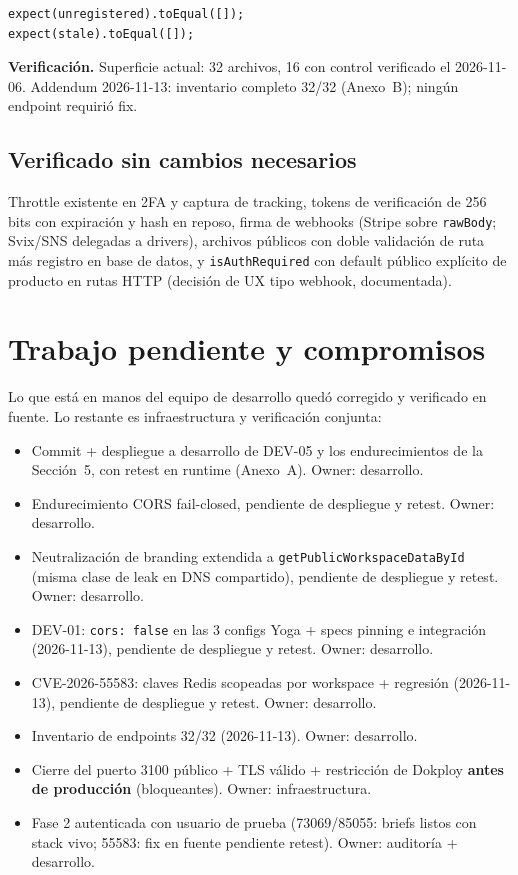\documentclass[11pt,a4paper]{article}
\begin{document}
\begin{lstlisting}[style=ts]
expect(unregistered).toEqual([]);
expect(stale).toEqual([]);
\end{lstlisting}

\textbf{Verificación.} Superficie actual: 32 archivos, 16 con control verificado el
2026-11-06. Addendum 2026-11-13: inventario completo 32/32 (Anexo~B); ningún
endpoint requirió fix.

\subsection{Verificado sin cambios necesarios}

Throttle existente en 2FA y captura de tracking, tokens de verificación de 256 bits
con expiración y hash en reposo, firma de webhooks (Stripe sobre \texttt{rawBody};
Svix/SNS delegadas a drivers), archivos públicos con doble validación de ruta más
registro en base de datos, y \texttt{isAuthRequired} con default público explícito de
producto en rutas HTTP (decisión de UX tipo webhook, documentada).

\section{Trabajo pendiente y compromisos}

Lo que está en manos del equipo de desarrollo quedó corregido y verificado en fuente.
Lo restante es infraestructura y verificación conjunta:

\begin{itemize}
\item[$\square$] Commit + despliegue a desarrollo de DEV-05 y los endurecimientos
de la Sección~5, con retest en runtime (Anexo~A). Owner: desarrollo.
\item[$\boxtimes$] Endurecimiento CORS fail-closed, pendiente de despliegue y
retest. Owner: desarrollo.
\item[$\boxtimes$] Neutralización de branding extendida a
\texttt{getPublicWorkspaceDataById} (misma clase de leak en DNS compartido),
pendiente de despliegue y retest. Owner: desarrollo.
\item[$\boxtimes$] DEV-01: \texttt{cors: false} en las 3 configs Yoga + specs
pinning e integración (2026-11-13), pendiente de despliegue y retest. Owner:
desarrollo.
\item[$\boxtimes$] CVE-2026-55583: claves Redis scopeadas por workspace +
regresión (2026-11-13), pendiente de despliegue y retest. Owner: desarrollo.
\item[$\boxtimes$] Inventario de endpoints 32/32 (2026-11-13). Owner: desarrollo.
\item[$\square$] Cierre del puerto 3100 público + TLS válido + restricción de
Dokploy \textbf{antes de producción} (bloqueantes). Owner: infraestructura.
\item[$\square$] Fase 2 autenticada con usuario de prueba (73069/85055: briefs
listos con stack vivo; 55583: fix en fuente pendiente retest). Owner: auditoría
+ desarrollo.
\end{itemize}
\end{document}
